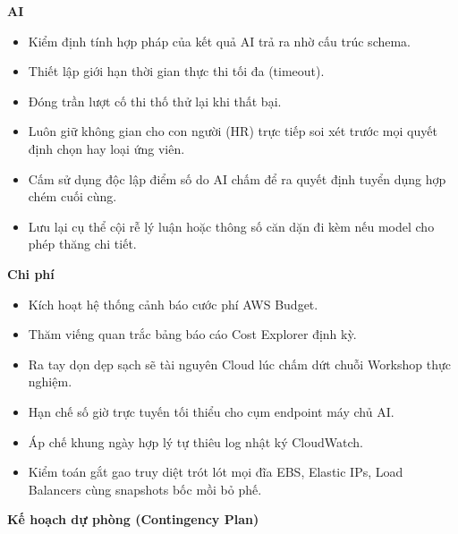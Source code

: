 \textbf{AI}

\begin{itemize}
\tightlist
\item
  Kiểm định tính hợp pháp của kết quả AI trả ra nhờ cấu trúc schema.
\item
  Thiết lập giới hạn thời gian thực thi tối đa (timeout).
\item
  Đóng trần lượt cố thi thố thử lại khi thất bại.
\item
  Luôn giữ không gian cho con người (HR) trực tiếp soi xét trước mọi
  quyết định chọn hay loại ứng viên.
\item
  Cấm sử dụng độc lập điểm số do AI chấm để ra quyết định tuyển dụng hợp
  chém cuối cùng.
\item
  Lưu lại cụ thể cội rễ lý luận hoặc thông số căn dặn đi kèm nếu model
  cho phép thăng chi tiết.
\end{itemize}

\textbf{Chi phí}

\begin{itemize}
\tightlist
\item
  Kích hoạt hệ thống cảnh báo cước phí AWS Budget.
\item
  Thăm viếng quan trắc bảng báo cáo Cost Explorer định kỳ.
\item
  Ra tay dọn dẹp sạch sẽ tài nguyên Cloud lúc chấm dứt chuỗi Workshop
  thực nghiệm.
\item
  Hạn chế số giờ trực tuyến tối thiểu cho cụm endpoint máy chủ AI.
\item
  Áp chế khung ngày hợp lý tự thiêu log nhật ký CloudWatch.
\item
  Kiểm toán gắt gao truy diệt trót lót mọi đĩa EBS, Elastic IPs, Load
  Balancers cùng snapshots bốc mồi bỏ phế.
\end{itemize}

\vspace{0.5em}\noindent\textbf{Kế hoạch dự phòng (Contingency
Plan)}\par

